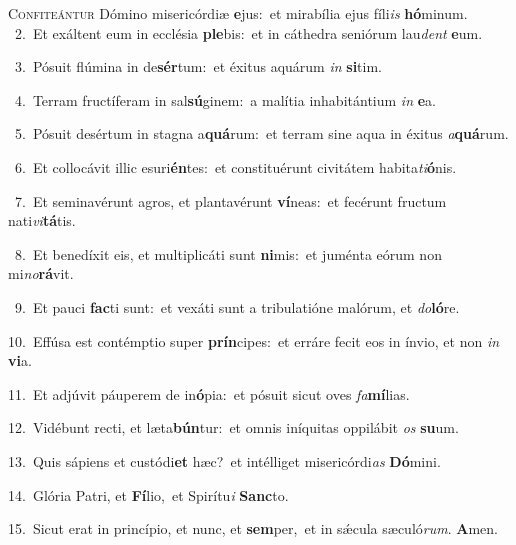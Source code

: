 \lettrine{\initial\textcolor{\initialcolor}{C}}{onfiteántur} Dómino misericórdiæ \textbf{e}\-jus:~\star et mirabília ejus fíli\textit{is} \textbf{hó}\-minum.\\
{\numbfont\textcolor{\numbcolor}{~2.}}~Et exáltent eum in ecclésia \textbf{ple}\-bis:~\star et in cáthedra seniórum lau\textit{dent} \textbf{e}\-um.\par
{\numbfont\textcolor{\numbcolor}{~3.}}~Pósuit flúmina in de\-\textbf{sér}\-tum:~\star et éxitus aquárum \textit{in} \textbf{si}\-tim.\par
{\numbfont\textcolor{\numbcolor}{~4.}}~Terram fructíferam in sal\-\textbf{sú}\-ginem:~\star a malítia inhabitántium \textit{in} \textbf{e}\-a.\par
{\numbfont\textcolor{\numbcolor}{~5.}}~Pósuit desértum in stagna a\-\textbf{quá}\-rum:~\star et terram sine aqua in éxitus \textit{a}\-\textbf{quá}rum.\par
{\numbfont\textcolor{\numbcolor}{~6.}}~Et collocávit illic esuri\-\textbf{én}\-tes:~\star et constituérunt civitátem habita\-\textit{ti}\-\textbf{ó}nis.\par
{\numbfont\textcolor{\numbcolor}{~7.}}~Et seminavérunt agros, et plantavérunt \textbf{ví}\-neas:~\star et fecérunt fructum nati\-\textit{vi}\-\textbf{tá}tis.\par
{\numbfont\textcolor{\numbcolor}{~8.}}~Et benedíxit eis, et multiplicáti sunt \textbf{ni}\-mis:~\star et juménta eórum non mi\-\textit{no}\-\textbf{rá}vit.\par
{\numbfont\textcolor{\numbcolor}{~9.}}~Et pauci \textbf{fac}\-ti sunt:~\star et vexáti sunt a tribulatióne malórum, et \textit{do}\-\textbf{ló}re.\par
{\numbfont\textcolor{\numbcolor}{10.}}~Effúsa est contémptio super \textbf{prín}\-cipes:~\star et erráre fecit eos in ínvio, et non \textit{in} \textbf{vi}\-a.\par
{\numbfont\textcolor{\numbcolor}{11.}}~Et adjúvit páuperem de in\-\textbf{ó}\-pia:~\star et pósuit sicut oves \textit{fa}\-\textbf{mí}lias.\par
{\numbfont\textcolor{\numbcolor}{12.}}~Vidébunt recti, et læta\-\textbf{bún}\-tur:~\star et omnis iníquitas oppilábit \textit{os} \textbf{su}\-um.\par
{\numbfont\textcolor{\numbcolor}{13.}}~Quis sápiens et custódi\textbf{et} hæc?~\star et intélliget misericórdi\textit{as} \textbf{Dó}\-mini.\par
{\numbfont\textcolor{\numbcolor}{14.}}~Glória Patri, et \textbf{Fí}\-lio,~\star et Spirítu\textit{i} \textbf{Sanc}\-to.\par
{\numbfont\textcolor{\numbcolor}{15.}}~Sicut erat in princípio, et nunc, et \textbf{sem}\-per,~\star et in sǽcula sæculó\-\textit{rum}\-. \textbf{A}\-men.\par
